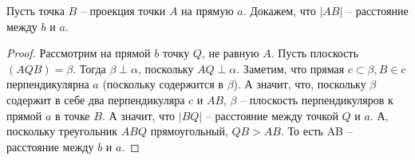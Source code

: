 Пусть точка $B$ -- проекция точки $A$ на прямую $a$. Докажем, что $|AB|$ -- расстояние между $b$ и $a$.

\begin{proof}
Рассмотрим на прямой $b$ точку $Q$, не равную $A$. Пусть плоскость $(AQB) = \beta$. Тогда $\beta \perp \alpha$, поскольку $AQ \perp \alpha$. Заметим, что прямая $c\subset\beta, B\in c$ перпендикулярна $a$ (поскольку содержится в $\beta$). А значит, что, поскольку $\beta$ содержит в себе два перпендикуляра $c$ и $AB$, $\beta$ -- плоскость перпендикуляров к прямой $a$ в точке $B$. А значит, что $|BQ|$ -- расстояние между точкой $Q$ и $a$. А, поскольку треугольник $ABQ$ прямоугольный, $QB > AB$. То есть AB -- расстояние между $b$ и $a$. 
\end{proof}